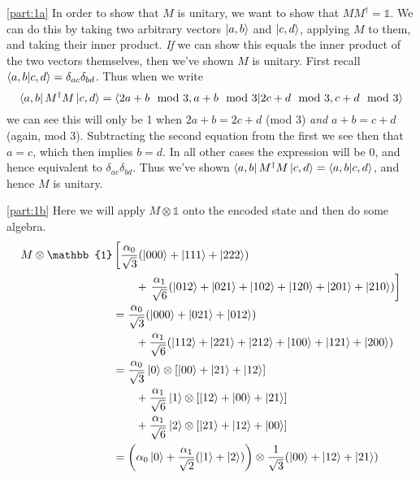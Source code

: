 \documentclass[boxes,pages]{homework}
\begin{document}
\begin{solution}
	\ref{part:1a}
	In order to show that $M$ is unitary, we want to show that $MM^\dagger = \mathbb{1}$. We can do this by taking two arbitrary vectors $\ket{a, b}$ and $\ket{c, d}$, applying $M$ to them, and taking their inner product. \emph{If} we can show this equals the inner product of the two vectors themselves, then we've shown $M$ is unitary. First recall $\ip{a, b}{c, d} = \delta_{ac}\delta_{bd}$. Thus when we write
	\begin{equation*}
		\bra{a, b}M^\dagger M\ket{c, d} = \braket{2a + b\mod 3, a + b \mod 3}{2c + d\mod 3, c + d \mod 3}
	\end{equation*}
	we can see this will only be 1 when $2a + b = 2c + d$ (mod 3) \emph{and} $a + b = c + d$ (again, mod 3). Subtracting the second equation from the first we see then that $a = c$, which then implies $b = d$. In all other cases the expression will be 0, and hence equivalent to $\delta_{ac}\delta_{bd}$. Thus we've shown $\bra{a, b}M^\dagger M\ket{c, d} = \ip{a, b}{c, d}$, and hence $M$ is unitary.

	\ref{part:1b}
	Here we will apply $M\otimes\mathbb{1}$ onto the encoded state and then do some algebra.
	\begin{align*}
		M\otimes\mathbb{1} & \left[\frac{\alpha_0}{\sqrt{3}}\qty(\ket{000} + \ket{111} + \ket{222})\right.                                                            \\
		                   & \qquad + \left.\frac{\alpha_1}{\sqrt{6}}\qty(\ket{012} + \ket{021} + \ket{102} + \ket{120} + \ket{201} + \ket{210})\right]               \\
		                   & = \frac{\alpha_0}{\sqrt{3}}\qty(\ket{000} + \ket{021} + \ket{012})                                                                       \\
		                   & \qquad + \frac{\alpha_1}{\sqrt{6}}\qty(\ket{112} + \ket{221} + \ket{212} + \ket{100} + \ket{121} + \ket{200})                            \\
		                   & = \frac{\alpha_0}{\sqrt{3}}\ket{0}\otimes\qty[\ket{00} + \ket{21} + \ket{12}]                                                            \\
		                   & \qquad + \frac{\alpha_1}{\sqrt{6}}\ket{1}\otimes\qty[\ket{12} + \ket{00} + \ket{21}]                                                     \\
		                   & \qquad + \frac{\alpha_1}{\sqrt{6}}\ket{2}\otimes\qty[\ket{21} + \ket{12} + \ket{00}]                                                     \\
		                   & = \qty(\alpha_0\ket{0} + \frac{\alpha_1}{\sqrt{2}}\qty(\ket{1} + \ket{2}))\otimes \frac{1}{\sqrt{3}}\qty(\ket{00} + \ket{12} + \ket{21})
	\end{align*}


\end{solution}
\end{document}
